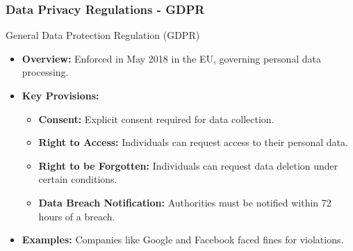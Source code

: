 \documentclass[aspectratio=169]{beamer}
\begin{document}
\begin{frame}[fragile]
    \frametitle{Data Privacy Regulations - GDPR}
    \begin{block}{General Data Protection Regulation (GDPR)}
        \begin{itemize}
            \item \textbf{Overview:} Enforced in May 2018 in the EU, governing personal data processing.
            \item \textbf{Key Provisions:}
            \begin{itemize}
                \item \textbf{Consent:} Explicit consent required for data collection.
                \item \textbf{Right to Access:} Individuals can request access to their personal data.
                \item \textbf{Right to be Forgotten:} Individuals can request data deletion under certain conditions.
                \item \textbf{Data Breach Notification:} Authorities must be notified within 72 hours of a breach.
            \end{itemize}
            \item \textbf{Examples:} Companies like Google and Facebook faced fines for violations.
        \end{itemize}
    \end{block}
\end{frame}
\end{document}
